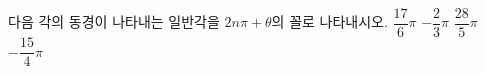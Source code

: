 다음 각의 동경이 나타내는 일반각을 $2n\pi+\theta$의 꼴로 나타내시오. 
 $\dfrac{17}{6}\pi$
 $-\dfrac{2}{3}\pi$
 $\dfrac{28}{5}\pi$
 $-\dfrac{15}{4}\pi$
